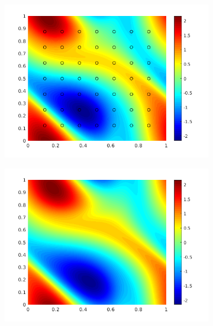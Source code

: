 \documentclass{article} %
\begin{document}
\begin{figure}[t]
    \begin{subfigure}[b]{0.32\textwidth}
        \includegraphics[width=\textwidth]{figs/gu_truth.png}
    \end{subfigure}
    \begin{subfigure}[b]{0.32\textwidth}
        \includegraphics[width=\textwidth]{figs/gumean_truth.png}
    \end{subfigure}
    \begin{subfigure}[b]{0.32\textwidth}

\end{subfigure}
\end{figure}
\end{document}

